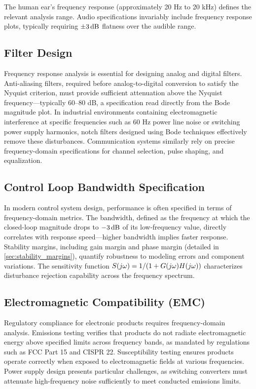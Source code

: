 The human ear's frequency response (approximately 20 Hz to 20 kHz) defines the relevant analysis range. Audio specifications invariably include frequency response plots, typically requiring $\pm 3\,\text{dB}$ flatness over the audible range.

\subsection{Filter Design}

Frequency response analysis is essential for designing analog and digital filters. Anti-aliasing filters, required before analog-to-digital conversion to satisfy the Nyquist criterion, must provide sufficient attenuation above the Nyquist frequency---typically 60--80 dB, a specification read directly from the Bode magnitude plot. In industrial environments containing electromagnetic interference at specific frequencies such as 60 Hz power line noise or switching power supply harmonics, notch filters designed using Bode techniques effectively remove these disturbances. Communication systems similarly rely on precise frequency-domain specifications for channel selection, pulse shaping, and equalization.

\subsection{Control Loop Bandwidth Specification}

In modern control system design, performance is often specified in terms of frequency-domain metrics. The bandwidth, defined as the frequency at which the closed-loop magnitude drops to $-3\,\text{dB}$ of its low-frequency value, directly correlates with response speed---higher bandwidth implies faster response. Stability margins, including gain margin and phase margin (detailed in \cref{sec:stability_margins}), quantify robustness to modeling errors and component variations. The sensitivity function $S(j\omega) = 1/(1+G(j\omega)H(j\omega))$ characterizes disturbance rejection capability across the frequency spectrum.

\subsection{Electromagnetic Compatibility (EMC)}

Regulatory compliance for electronic products requires frequency-domain analysis. Emissions testing verifies that products do not radiate electromagnetic energy above specified limits across frequency bands, as mandated by regulations such as FCC Part 15 and CISPR 22. Susceptibility testing ensures products operate correctly when exposed to electromagnetic fields at various frequencies. Power supply design presents particular challenges, as switching converters must attenuate high-frequency noise sufficiently to meet conducted emissions limits.

